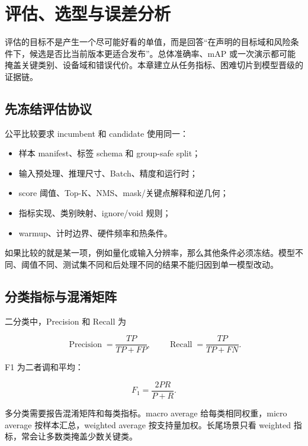 \chapter{评估、选型与误差分析}
\label{chap:edge-ai-evaluation-error-analysis}

评估的目标不是产生一个尽可能好看的单值，而是回答“在声明的目标域和风险条件下，候选是否比当前版本更适合发布”。总体准确率、mAP 或一次演示都可能掩盖关键类别、设备域和错误代价。本章建立从任务指标、困难切片到模型晋级的证据链。

\section{先冻结评估协议}

公平比较要求 incumbent 和 candidate 使用同一：

\begin{itemize}
  \item 样本 manifest、标签 schema 和 group-safe split；
  \item 输入预处理、推理尺寸、Batch、精度和运行时；
  \item score 阈值、Top-K、NMS、mask/关键点解释和逆几何；
  \item 指标实现、类别映射、ignore/void 规则；
  \item warmup、计时边界、硬件频率和热条件。
\end{itemize}

如果比较的就是某一项，例如量化或输入分辨率，那么其他条件必须冻结。模型不同、阈值不同、测试集不同和后处理不同的结果不能归因到单一模型改动。

\section{分类指标与混淆矩阵}

二分类中，Precision 和 Recall 为

\begin{equation}
  \operatorname{Precision}=\frac{TP}{TP+FP},\qquad
  \operatorname{Recall}=\frac{TP}{TP+FN}.
\end{equation}

F1 为二者调和平均：

\begin{equation}
  F_1=\frac{2PR}{P+R}.
\end{equation}

多分类需要报告混淆矩阵和每类指标。macro average 给每类相同权重，micro average 按样本汇总，weighted average 按支持量加权。长尾场景只看 weighted 指标，常会让多数类掩盖少数关键类。

